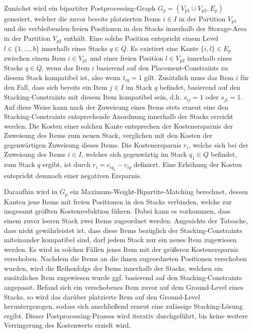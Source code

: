 Zunächst wird ein bipartiter Postprocessing-Graph $G_p = (V_{p1} \cup V_{p2}, E_p)$ generiert, welcher die zuvor bereits platzierten Items $i \in I$ in der Partition $V_{p1}$ und die verbleibenden freien Positionen in den Stacks innerhalb der Storage-Area in der Partition $V_{p2}$ enthält. Eine solche Position entspricht einem Level $l \in \{1, \dotsc, b\}$ innerhalb eines Stacks $q \in Q$. Es existiert eine Kante $\{i, l\} \in E_p$ zwischen einem Item $i \in V_{p1}$ und einer freien Position $l \in V_{p2}$ innerhalb eines Stacks $q \in Q$, wenn das Item $i$ basierend auf den Placement-Constraints zu diesem Stack kompatibel ist, also wenn $t_{iq} = 1$ gilt. Zusätzlich muss das Item $i$ für den Fall, dass sich bereits ein Item $j \in I$ im Stack $q$ befindet, basierend auf den Stacking-Constraints mit diesem Item kompatibel sein, d.h. $s_{ij} = 1$ oder $s_{ji} = 1$.
Auf diese Weise kann nach der Zuweisung eines Items stets erneut eine den Stacking-Constraints entsprechende Anordnung innerhalb der Stacks erreicht werden. Die Kosten einer solchen Kante entsprechen der Kostenersparnis der Zuweisung des Items zum neuen Stack, verglichen mit den Kosten der gegenwärtigen Zuweisung dieses Items. Die Kostenersparnis $r_i$, welche sich bei der Zuweisung des Items $i \in I$, welches sich gegenwärtig im Stack $q_1 \in Q$ befindet, zum Stack $q$ ergibt, ist durch $r_i = c_{iq_1} - c_{iq}$ definiert. Eine Erhöhung der Kosten entspricht demnach einer negativen Ersparnis.

Daraufhin wird in $G_p$ ein Maximum-Weight-Bipartite-Matching berechnet, dessen Kanten jene Items mit freien
Positionen in den Stacks verbinden, welche zur insgesamt größten Kostenreduktion führen.
Dabei kann es vorkommen, dass einem zuvor leeren Stack zwei Items zugeordnet werden. Angesichts der Tatsache,
dass nicht gewährleistet ist, dass diese Items bezüglich der Stacking-Constraints miteinander kompatibel sind,
darf jedem Stack nur ein neues Item zugewiesen werden.
Es wird in solchen Fällen jenes Item mit der größeren Kostenersparnis verschoben.
Nachdem die Items an die ihnen zugeordneten Positionen verschoben wurden,
wird die Reihenfolge der Items innerhalb der Stacks, welchen ein zusätzliches Item zugewiesen
wurde ggf. basierend auf den Stacking-Constraints angepasst.
Befand sich ein verschobenes Item zuvor auf dem Ground-Level eines Stacks,
so wird das darüber platzierte Item auf den Ground-Level heruntergezogen,
sodass sich anschließend erneut eine zulässige Stacking-Lösung ergibt.
Dieser Postprocessing-Prozess wird iterativ durchgeführt, bis keine weitere Verringerung des Kostenwerts erzielt wird.\newline

